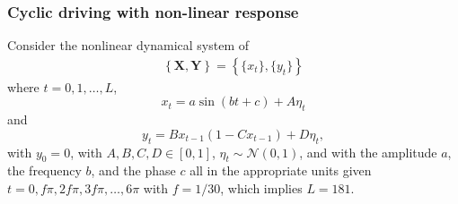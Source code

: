 \documentclass{article}[10pt]
\begin{document}
\subsubsection{Cyclic driving with non-linear response}
\label{sec:nonli}
Consider the nonlinear dynamical system of
\begin{eqnarray}
\label{eqn:nonlinearEX}
\left\{\mathbf{X},\mathbf{Y}\right\} = \left\{\{x_t\},\{y_t\}\right\}
\end{eqnarray}
where $t=0,1,\ldots,L$,
\begin{equation*}
x_t = a\sin(bt+c)+A\eta_t
\end{equation*}
and
\begin{equation*}
y_t = Bx_{t-1}\left(1-Cx_{t-1}\right)+D\eta_t,
\end{equation*}
with $y_0 = 0$, with $A,B,C,D\in[0,1]$, $\eta_t\sim\mathcal{N}\left(0,1\right)$, and with the amplitude $a$, the frequency $b$, and the phase $c$ all in the appropriate units given $t=0,f\pi,2f\pi,3f\pi,\ldots,6\pi$ with $f=1/30$, which implies $L=181$.
\end{document}
